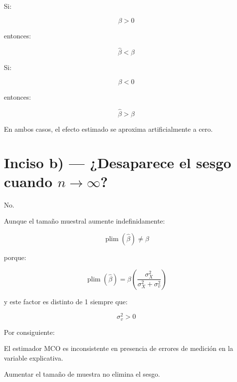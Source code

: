 \documentclass[12pt,letterpaper]{article}
\newcommand{\plim}{\operatorname{plim}}
\begin{document}
Si:

\begin{equation}
\beta>0
\end{equation}

entonces:

\begin{equation}
\hat{\beta}<\beta
\end{equation}

Si:

\begin{equation}
\beta<0
\end{equation}

entonces:

\begin{equation}
\hat{\beta}>\beta
\end{equation}

En ambos casos, el efecto estimado se aproxima artificialmente a cero.

\section{Inciso b) --- ¿Desaparece el sesgo cuando $n\to\infty$?}

No.

Aunque el tamaño muestral aumente indefinidamente:

\begin{equation}
\plim(\hat{\beta})\neq\beta
\end{equation}

porque:

\begin{equation}
\plim(\hat{\beta})
=
\beta
\left(
\frac{\sigma_X^2}
{\sigma_X^2+\sigma_v^2}
\right)
\end{equation}

y este factor es distinto de 1 siempre que:

\begin{equation}
\sigma_v^2>0
\end{equation}

Por consiguiente:

\begin{clave}

El estimador MCO es inconsistente en presencia de errores de medición
en la variable explicativa.

Aumentar el tamaño de muestra no elimina el sesgo.

\end{clave}
\end{document}
